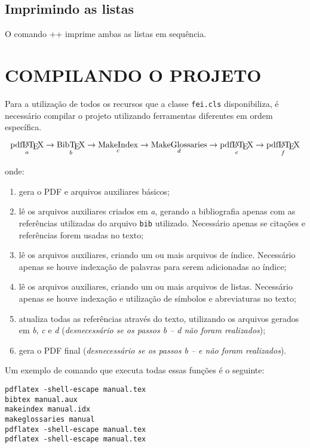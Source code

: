 \documentclass{fei}
\begin{document}
	\section{Imprimindo as listas}
	
	O comando \latexinline+\printglossaries+ imprime ambas as listas em sequência.

	\chapter{COMPILANDO O PROJETO} \label{chap:compilando}
	
	Para a utilização de todos os recursos que a classe \texttt{fei.cls} disponibiliza, é necessário compilar o projeto utilizando ferramentas diferentes em ordem específica.
	
	\[\operatorname*{\text{pdf\LaTeX}}_a \to \operatorname*{\text{Bib\TeX}}_b \to \operatorname*{\text{MakeIndex}}_c \to \operatorname*{\text{MakeGlossaries}}_d \to \operatorname*{\text{pdf\LaTeX}}_e \to \operatorname*{\text{pdf\LaTeX}}_f\]
	
	onde:
	
	\begin{enumerate}
	\item gera o PDF e arquivos auxiliares básicos;
	\item lê os arquivos auxiliares criados em \emph{a}, gerando a bibliografia apenas com as referências utilizadas do arquivo \texttt{bib} utilizado. Necessário apenas se citações e referências forem usadas no texto;
	\item lê os arquivos auxiliares, criando um ou mais arquivos de índice. Necessário apenas se houve indexação de palavras para serem adicionadas ao índice;
	\item lê os arquivos auxiliares, criando um ou mais arquivos de listas. Necessário apenas se houve indexação e utilização de símbolos e abreviaturas no texto;
	\item atualiza todas as referências através do texto, utilizando os arquivos gerados em \emph{b}, \emph{c} e \emph{d} (\emph{desnecessário se os passos b -- d não foram realizados});
	\item gera o PDF final (\emph{desnecessário se os passos b -- e não foram realizados}).
	\end{enumerate}
	
	Um exemplo de comando que executa todas essas funções é o seguinte:
	
	\begin{verbatim}
pdflatex -shell-escape manual.tex
bibtex manual.aux
makeindex manual.idx
makeglossaries manual
pdflatex -shell-escape manual.tex
pdflatex -shell-escape manual.tex
	\end{verbatim}
	
\end{document}
